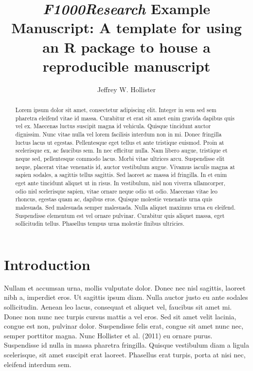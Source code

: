 \documentclass[10pt,a4paper,twocolumn]{article}
\begin{document}
\title{\textit{F1000Research} Example Manuscript: A template for using an R package to house a
reproducible manuscript}


\author[]{Jeffrey W. Hollister}

\affil[1]{}

\maketitle
\thispagestyle{fancy}



\begin{abstract}

Lorem ipsum dolor sit amet, consectetur adipiscing elit. Integer in sem sed sem pharetra eleifend vitae id massa. Curabitur et erat sit amet enim gravida dapibus quis vel ex. Maecenas luctus suscipit magna id vehicula. Quisque tincidunt auctor dignissim. Nunc vitae nulla vel lorem facilisis interdum non in mi. Donec fringilla luctus lacus ut egestas. Pellentesque eget tellus et ante tristique euismod. Proin at scelerisque ex, ac faucibus sem. In nec efficitur nulla. Nam libero augue, tristique et neque sed, pellentesque commodo lacus. Morbi vitae ultrices arcu. Suspendisse elit neque, placerat vitae venenatis id, auctor vestibulum augue. Vivamus iaculis magna at sapien sodales, a sagittis tellus sagittis. Sed laoreet ac massa id fringilla. In et enim eget ante tincidunt aliquet ut in risus. In vestibulum, nisl non viverra ullamcorper, odio nisl scelerisque sapien, vitae ornare neque odio ut odio. Maecenas vitae leo rhoncus, egestas quam ac, dapibus eros. Quisque molestie venenatis urna quis malesuada. Sed malesuada semper malesuada. Nulla aliquet maximus urna eu eleifend. Suspendisse elementum est vel ornare pulvinar. Curabitur quis aliquet massa, eget sollicitudin tellus. Phasellus tempus urna molestie finibus ultricies.

\end{abstract}

\section{Introduction}\label{introduction}

Nullam et accumsan urna, mollis vulputate dolor. Donec nec nisl
sagittis, laoreet nibh a, imperdiet eros. Ut sagittis ipsum diam. Nulla
auctor justo eu ante sodales sollicitudin. Aenean leo lacus, consequat
et aliquet vel, faucibus sit amet mi. Donec non nunc nec turpis cursus
mattis a vel eros. Sed sit amet velit lacinia, congue est non, pulvinar
dolor. Suspendisse felis erat, congue sit amet nunc nec, semper
porttitor magna. Nunc Hollister et al. (2011) eu ornare purus.
Suspendisse id nulla in massa pharetra fringilla. Quisque vestibulum
diam a ligula scelerisque, sit amet suscipit erat laoreet. Phasellus
erat turpis, porta at nisi nec, eleifend interdum sem.
\end{document}

